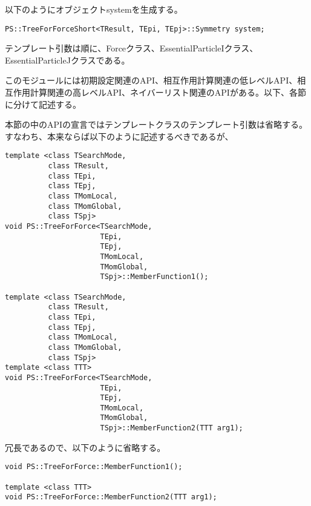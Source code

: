 
以下のようにオブジェクトsystemを生成する。
\begin{screen}
\begin{verbatim}
PS::TreeForForceShort<TResult, TEpi, TEpj>::Symmetry system;
\end{verbatim}
\end{screen}
テンプレート引数は順に、Forceクラス、EssentialParticleIクラス、
EssentialParticleJクラスである。


このモジュールには初期設定関連のAPI、相互作用計算関連の低レベルAPI、相
互作用計算関連の高レベルAPI、ネイバーリスト関連のAPIがある。以下、各節
に分けて記述する。

本節の中のAPIの宣言ではテンプレートクラスのテンプレート引数は省略する。
すなわち、本来ならば以下のように記述するべきであるが、
\begin{screen}
\begin{verbatim}
template <class TSearchMode,
          class TResult,
          class TEpi,
          class TEpj,
          class TMomLocal,
          class TMomGlobal,
          class TSpj>
void PS::TreeForForce<TSearchMode,
                      TEpi,
                      TEpj,
                      TMomLocal,
                      TMomGlobal,
                      TSpj>::MemberFunction1();

template <class TSearchMode,
          class TResult,
          class TEpi,
          class TEpj,
          class TMomLocal,
          class TMomGlobal,
          class TSpj>
template <class TTT>
void PS::TreeForForce<TSearchMode,
                      TEpi,
                      TEpj,
                      TMomLocal,
                      TMomGlobal,
                      TSpj>::MemberFunction2(TTT arg1);
\end{verbatim}
\end{screen}
冗長であるので、以下のように省略する。
\begin{screen}
\begin{verbatim}
void PS::TreeForForce::MemberFunction1();

template <class TTT>
void PS::TreeForForce::MemberFunction2(TTT arg1);
\end{verbatim}
\end{screen}


